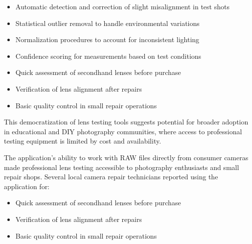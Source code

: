 \begin{itemize}
    \item Automatic detection and correction of slight misalignment in test shots
    \item Statistical outlier removal to handle environmental variations
    \item Normalization procedures to account for inconsistent lighting
    \item Confidence scoring for measurements based on test conditions
\end{itemize}


\begin{itemize}
    \item Quick assessment of secondhand lenses before purchase
    \item Verification of lens alignment after repairs
    \item Basic quality control in small repair operations
\end{itemize}

This democratization of lens testing tools suggests potential for broader adoption in educational and DIY photography communities, where access to professional testing equipment is limited by cost and availability.


The application's ability to work with RAW files directly from consumer cameras made professional lens testing accessible to photography enthusiasts and small repair shops. Several local camera repair technicians reported using the application for:

\begin{itemize}
    \item Quick assessment of secondhand lenses before purchase
    \item Verification of lens alignment after repairs
    \item Basic quality control in small repair operations
\end{itemize}


